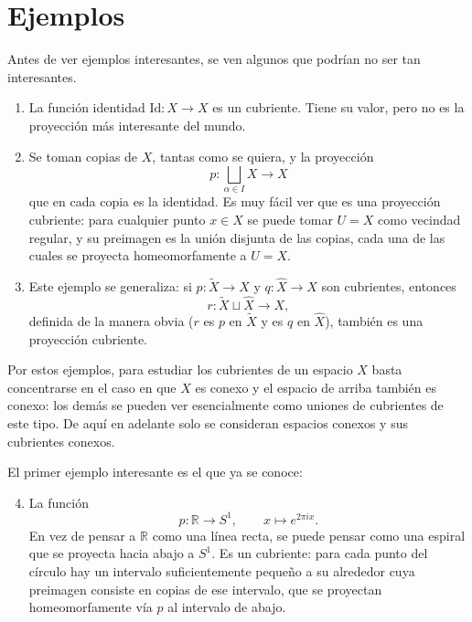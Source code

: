 \documentclass[11pt]{article}
\begin{document}
\section*{Ejemplos}

Antes de ver ejemplos interesantes, se ven algunos que podrían no ser tan interesantes.

\begin{enumerate}
  \item La función identidad $\mathrm{Id}\colon X\to X$ es un cubriente. Tiene su valor, pero no es la proyección más interesante del mundo.
  \item Se toman copias de $X$, tantas como se quiera, y la proyección
  \[
    p\colon\bigsqcup_{\alpha\in I}X\to X
  \]
  que en cada copia es la identidad. Es muy fácil ver que es una proyección cubriente: para cualquier punto $x\in X$ se puede tomar $U=X$ como vecindad regular, y su preimagen es la unión disjunta de las copias, cada una de las cuales se proyecta homeomorfamente a $U=X$.
  \item Este ejemplo se generaliza: si $p\colon\tilde X\to X$ y $q\colon\hat X\to X$ son cubrientes, entonces
  \[
    r\colon\tilde X\sqcup\hat X\to X,
  \]
  definida de la manera obvia ($r$ es $p$ en $\tilde X$ y es $q$ en $\hat X$), también es una proyección cubriente.
\end{enumerate}

Por estos ejemplos, para estudiar los cubrientes de un espacio $X$ basta concentrarse en el caso en que $X$ es conexo y el espacio de arriba también es conexo: los demás se pueden ver esencialmente como uniones de cubrientes de este tipo. De aquí en adelante solo se consideran espacios conexos y sus cubrientes conexos.

\medskip
El primer ejemplo interesante es el que ya se conoce:
\begin{enumerate}\setcounter{enumi}{3}
  \item La función
  \[
    p\colon\mathbb{R}\to S^1,\qquad x\mapsto e^{2\pi ix}.
  \]
  En vez de pensar a $\mathbb{R}$ como una línea recta, se puede pensar como una espiral que se proyecta hacia abajo a $S^1$. Es un cubriente: para cada punto del círculo hay un intervalo suficientemente pequeño a su alrededor cuya preimagen consiste en copias de ese intervalo, que se proyectan homeomorfamente vía $p$ al intervalo de abajo.
\end{enumerate}
\end{document}
